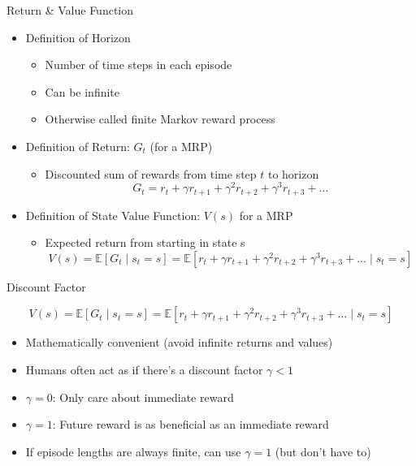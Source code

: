 \documentclass[aspectratio=169]{../latex_main/tntbeamer}  %
\begin{document}
\begin{frame}[c]{Return \& Value Function}
	
	\begin{itemize}
		\item Definition of Horizon
		\begin{itemize}
			\item Number of time steps in each episode
			\item Can be infinite
			\item Otherwise called finite Markov reward process
		\end{itemize}
	\smallskip
	\pause
		\item Definition of Return: $G_t$ (for a MRP)
		\begin{itemize}
			\item Discounted sum of rewards from time step $t$ to horizon
			$$ G_t = r_t + \gamma r_{t+1} + \gamma^2 r_{t+2} + \gamma^3 r_{t+3} + \ldots$$
		\end{itemize}
	\smallskip
	\pause
	\item Definition of State Value Function: $V(s)$ for a MRP
	\begin{itemize}
		\item Expected return from starting in state s
		$$ V(s)  = \mathbb{E}[G_t \mid s_t=s] = \mathbb{E}[r_t + \gamma r_{t+1} + \gamma^2 r_{t+2} + \gamma^3 r_{t+3} + \ldots \mid s_t = s]$$
	\end{itemize}
	\end{itemize}
	
\end{frame}
\begin{frame}[c]{Discount Factor}
	
$$ V(s)  = \mathbb{E}[G_t \mid s_t=s] = \mathbb{E}[r_t + \gamma r_{t+1} + \gamma^2 r_{t+2} + \gamma^3 r_{t+3} + \ldots \mid s_t = s]$$
	
	\begin{itemize}
		\item Mathematically convenient (avoid infinite returns and values)
		\item Humans often act as if there’s a discount factor $\gamma < 1$
		\item $\gamma = 0$: Only care about immediate reward
		\item $\gamma = 1$: Future reward is as beneficial as an immediate reward
		\item If episode lengths are always finite, can use $\gamma = 1$ (but don't have to)
	\end{itemize}
	
\end{frame}
\end{document}
